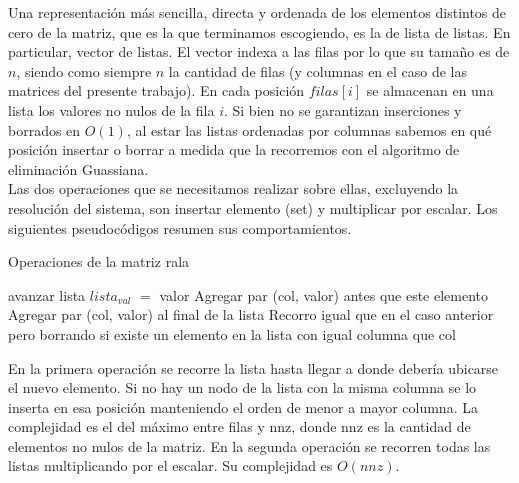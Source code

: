 Una representación más sencilla, directa y ordenada de los elementos distintos de cero de la matriz, que es la que terminamos escogiendo, es la de lista de listas. En particular, vector de listas. El vector indexa a las filas por lo que su tamaño es de $n$, siendo como siempre $n$ la cantidad de filas (y columnas en el caso de las matrices del presente trabajo). En cada posición $filas[i]$ se almacenan en una lista \cite{STL} los valores no nulos de la fila $i$. Si bien no se garantizan inserciones y borrados en $O(1)$, al estar las listas ordenadas por columnas sabemos en qué posición insertar o borrar a medida que la recorremos con el algoritmo de eliminación Guassiana. \\

Las dos operaciones que se necesitamos realizar sobre ellas, excluyendo la resolución del sistema, son insertar elemento (set) y multiplicar por escalar. Los siguientes pseudocódigos resumen sus comportamientos. \\

\begin{algorithm}[H]
\caption{Operaciones de la matriz rala}
\begin{algorithmic}[1]

      \State avanzar lista
    \EndWhile
      \State $lista_{val}$ $=$ valor 
    \Else
         \State Agregar par (col, valor) antes que este elemento 
      \Else
        \State Agregar par (col, valor) al final de la lista 
      \EndIf
    \EndIf              
\Else
    \State Recorro igual que en el caso anterior pero borrando si existe un elemento en la lista con igual columna que 
     col 
        
\EndIf

\EndProcedure  
\end{algorithmic}

\begin{algorithmic}[2]


\EndFor

\EndProcedure  
\end{algorithmic}
\end{algorithm}

En la primera operación se recorre la lista hasta llegar a donde debería ubicarse el nuevo elemento. Si no hay un nodo de la lista con la misma columna se lo inserta en esa posición manteniendo el orden de menor a mayor columna. La complejidad es el del máximo entre filas y nnz, donde nnz es la cantidad de elementos no nulos de la matriz.
En la segunda operación se recorren todas las listas multiplicando por el escalar. Su complejidad es $O(nnz)$.



